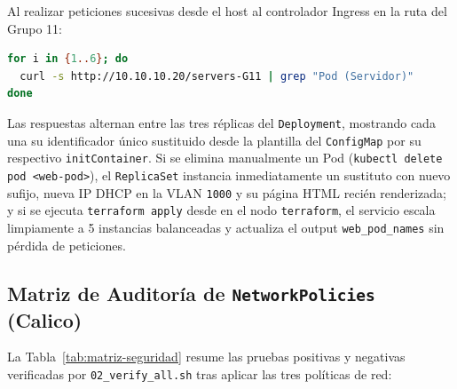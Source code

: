 Al realizar peticiones sucesivas desde el host al controlador Ingress en la ruta del Grupo 11:
\begin{lstlisting}[language=bash]
for i in {1..6}; do
  curl -s http://10.10.10.20/servers-G11 | grep "Pod (Servidor)"
done
\end{lstlisting}
Las respuestas alternan entre las tres réplicas del \texttt{Deployment}, mostrando cada una su identificador único sustituido desde la plantilla del \texttt{ConfigMap} por su respectivo \texttt{initContainer}. Si se elimina manualmente un Pod (\texttt{kubectl delete pod <web-pod>}), el \texttt{ReplicaSet} instancia inmediatamente un sustituto con nuevo sufijo, nueva IP DHCP en la VLAN \texttt{1000} y su página HTML recién renderizada; y si se ejecuta \texttt{terraform apply}  desde  en el nodo \texttt{terraform}, el servicio escala limpiamente a 5 instancias balanceadas y actualiza el output \texttt{web\_pod\_names} sin pérdida de peticiones.

\subsection{Matriz de Auditoría de \texttt{NetworkPolicies} (Calico)}

La Tabla~\ref{tab:matriz-seguridad} resume las pruebas positivas y negativas verificadas por \texttt{02\_verify\_all.sh} tras aplicar las tres políticas de red:

